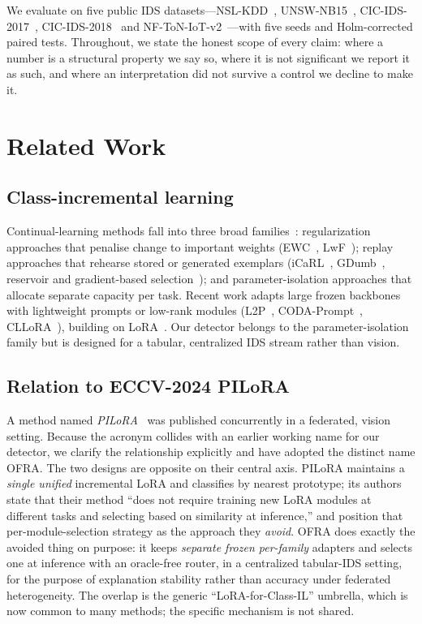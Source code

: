 \documentclass[conference]{IEEEtran}
\begin{document}
We evaluate on five public IDS datasets---NSL-KDD~\cite{tavallaee2009detailed},
UNSW-NB15~\cite{moustafa2015unsw}, CIC-IDS-2017~\cite{sharafaldin2018toward},
CIC-IDS-2018~\cite{cicids2018} and NF-ToN-IoT-v2~\cite{sarhan2021netflow}---with
five seeds and Holm-corrected paired tests. Throughout, we state the honest
scope of every claim: where a number is a structural property we say so, where it
is not significant we report it as such, and where an interpretation did not
survive a control we decline to make it.

\section{Related Work}
\label{sec:related}

\subsection{Class-incremental learning}
Continual-learning methods fall into three broad
families~\cite{masana2023class}: regularization approaches that penalise change
to important weights (EWC~\cite{kirkpatrick2017overcoming},
LwF~\cite{li2017learning}); replay approaches that rehearse stored or generated
exemplars (iCaRL~\cite{rebuffi2017icarl}, GDumb~\cite{prabhu2020gdumb},
reservoir and gradient-based selection~\cite{aljundi2019gradient}); and
parameter-isolation approaches that allocate separate capacity per task. Recent
work adapts large frozen backbones with lightweight prompts or low-rank modules
(L2P~\cite{wang2022l2p}, CODA-Prompt~\cite{smith2023coda},
CLLoRA~\cite{liang2025cllora}), building on
LoRA~\cite{hu2021lora}. Our detector belongs to the parameter-isolation family
but is designed for a tabular, centralized IDS stream rather than vision.

\subsection{Relation to ECCV-2024 PILoRA}
A method named \emph{PILoRA}~\cite{guo2024pilora} was published concurrently in a
federated, vision setting. Because the acronym collides with an earlier working
name for our detector, we clarify the relationship explicitly and have adopted
the distinct name OFRA. The two designs are opposite on their central axis.
PILoRA maintains a \emph{single unified} incremental LoRA and classifies by
nearest prototype; its authors state that their method ``does not require
training new LoRA modules at different tasks and selecting based on similarity at
inference,'' and position that per-module-selection strategy as the approach they
\emph{avoid}. OFRA does exactly the avoided thing on purpose: it keeps
\emph{separate frozen per-family} adapters and selects one at inference with an
oracle-free router, in a centralized tabular-IDS setting, for the purpose of
explanation stability rather than accuracy under federated heterogeneity. The
overlap is the generic ``LoRA-for-Class-IL'' umbrella, which is now common to
many methods; the specific mechanism is not shared.
\end{document}

